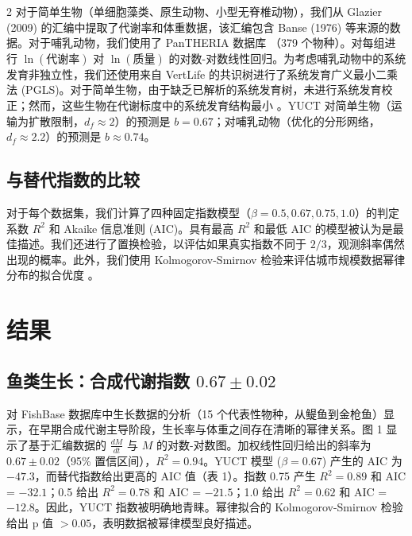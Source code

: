\documentclass[11pt,a4paper]{article}
\newcommand{\df}{d_f}
\begin{document}
\begin{multicols}{2}
		对于简单生物（单细胞藻类、原生动物、小型无脊椎动物），我们从 Glazier (2009) \cite{Glazier2009} 的汇编中提取了代谢率和体重数据，该汇编包含 Banse (1976) \cite{Banse1976} 等来源的数据。对于哺乳动物，我们使用了 PanTHERIA 数据库 \cite{PanTHERIA}（379 个物种）。对每组进行 \(\ln(\text{代谢率})\) 对 \(\ln(\text{质量})\) 的对数-对数线性回归。为考虑哺乳动物中的系统发育非独立性，我们还使用来自 VertLife \cite{VertLife} 的共识树进行了系统发育广义最小二乘法 (PGLS)。对于简单生物，由于缺乏已解析的系统发育树，未进行系统发育校正；然而，这些生物在代谢标度中的系统发育结构最小 \cite{Glazier2005}。YUCT 对简单生物（运输为扩散限制，\(\df \approx 2\)）的预测是 \(b = 0.67\)；对哺乳动物（优化的分形网络，\(\df \approx 2.2\)）的预测是 \(b \approx 0.74\)。
		
		\subsection{与替代指数的比较}
		
		对于每个数据集，我们计算了四种固定指数模型（\(\beta = 0.5, 0.67, 0.75, 1.0\)）的判定系数 \(R^2\) 和 Akaike 信息准则 (AIC)。具有最高 \(R^2\) 和最低 AIC 的模型被认为是最佳描述。我们还进行了置换检验，以评估如果真实指数不同于 \(2/3\)，观测斜率偶然出现的概率。此外，我们使用 Kolmogorov-Smirnov 检验来评估城市规模数据幂律分布的拟合优度 \cite{Clauset2009}。
		
		\section{结果}
		
		\subsection{鱼类生长：合成代谢指数 \(0.67 \pm 0.02\)}
		
		对 FishBase 数据库中生长数据的分析（15 个代表性物种，从鳀鱼到金枪鱼）显示，在早期合成代谢主导阶段，生长率与体重之间存在清晰的幂律关系。图 1 显示了基于汇编数据的 \(\frac{dM}{dt}\) 与 \(M\) 的对数-对数图。加权线性回归给出的斜率为 \(0.67 \pm 0.02\)（95\% 置信区间），\(R^2 = 0.94\)。YUCT 模型 (\(\beta = 0.67\)) 产生的 AIC 为 \(-47.3\)，而替代指数给出更高的 AIC 值（表 1）。指数 0.75 产生 \(R^2 = 0.89\) 和 AIC = \(-32.1\)；0.5 给出 \(R^2 = 0.78\) 和 AIC = \(-21.5\)；1.0 给出 \(R^2 = 0.62\) 和 AIC = \(-12.8\)。因此，YUCT 指数被明确地青睐。幂律拟合的 Kolmogorov-Smirnov 检验给出 p 值 \(>0.05\)，表明数据被幂律模型良好描述。
		

\end{multicols}
\end{document}
